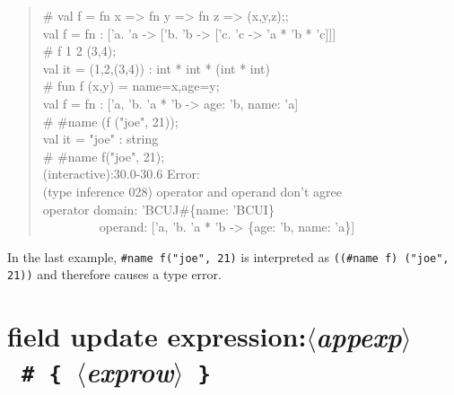 \documentclass{jbook}
\newcommand{\txt}[2]{#2}
\newcommand{\code}[1]{\mbox{\large\tt #1}}
\newcommand{\nonterm}[1]{\mbox{$\langle$}{\it #1}\mbox{$\rangle$}}
\newcommand{\term}[1]{\mbox{{\tt #1}}}
\newcommand{\myem}{\mbox{\ \ }}
\newenvironment{program}{\begin{quote}\begin{tt}}%
                        {\end{tt}\end{quote}}
\begin{document}
\begin{program}
\# val f = fn x => fn y => fn z => (x,y,z);;
\\
val f = fn : ['a. 'a -> ['b. 'b -> ['c. 'c -> 'a * 'b * 'c]]]
\\
\# f 1 2 (3,4);
\\
val it = (1,2,(3,4)) : int * int * (int * int)
\\
\# fun f (x,y) = {name=x,age=y};
\\
val f = fn : ['a, 'b. 'a * 'b -> {age: 'b, name: 'a}]
\\
\# \#name (f ("joe", 21));
\\
val it = "joe" : string
\\
\# \#name f("joe", 21);
\\
(interactive):30.0-30.6 Error:
\\
  (type inference 028) operator and operand don't agree
\\
  operator domain: 'BCUJ\#\{name: 'BCUI\}
\\
\myem\myem\myem\myem\          operand: ['a, 'b. 'a * 'b -> \{age: 'b, name: 'a\}]
\end{program}
	In the last example,
\code{\#name f("joe", 21)} is interpreted as
\code{((\#name f) ("joe", 21))} and therefore causes a type error.
\fi%



\section{\txt{フィールドアップデート式}{field update expression}:\nonterm{appexp}\ \term{\#}\ \term{\{}\ \nonterm{exprow}\ \term{\}}}
\end{document}
